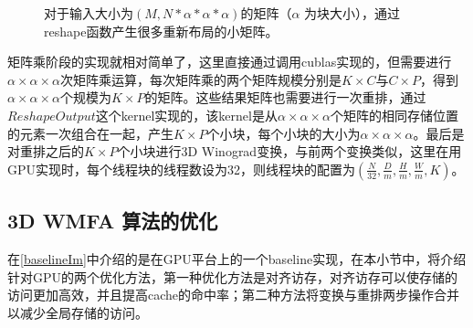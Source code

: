 \begin{figure}[tbh]%
\centering
{}
\caption{对于输入大小为$(M,N*\alpha *\alpha *\alpha)$的矩阵（$\alpha$ 为块大小），通过reshape函数产生很多重新布局的小矩阵。}
\label{reshape}
\end{figure}

矩阵乘阶段的实现就相对简单了，这里直接通过调用cublas实现的，但需要进行$\alpha \times \alpha \times \alpha$次矩阵乘运算，每次矩阵乘的两个矩阵规模分别是$K \times C$与$C \times P$，得到$\alpha \times \alpha \times \alpha$个规模为$K \times P$的矩阵。这些结果矩阵也需要进行一次重排，通过$ReshapeOutput$这个kernel实现的，该kernel是从$\alpha \times \alpha \times \alpha$个矩阵的相同存储位置的元素一次组合在一起，产生$K \times P$个小块，每个小块的大小为$\alpha \times \alpha \times \alpha$。最后是对重排之后的$K \times P$个小块进行3D Winograd变换，与前两个变换类似，这里在用GPU实现时，每个线程块的线程数设为32，则线程块的配置为$(\frac{N}{32},\frac{D}{m},\frac{H}{m},\frac{W}{m},K)$。

\subsection{3D WMFA 算法的优化}
在\ref{baselineIm}中介绍的是在GPU平台上的一个baseline实现，在本小节中，将介绍针对GPU的两个优化方法，第一种优化方法是对齐访存，对齐访存可以使存储的访问更加高效，并且提高cache的命中率；第二种方法将变换与重排两步操作合并以减少全局存储的访问。

